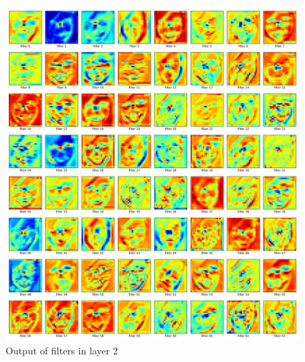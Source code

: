 \documentclass[fleqn,a4paper,12pt]{article}
\begin{document}
\begin{figure}[H]
  \centering
  \includegraphics[width=\linewidth]{report-imgs/filter-output.png}
  \caption{Output of filters in layer 2}
  \label{fig:Output of filters in layer 2}
\end{figure}
\end{document}
